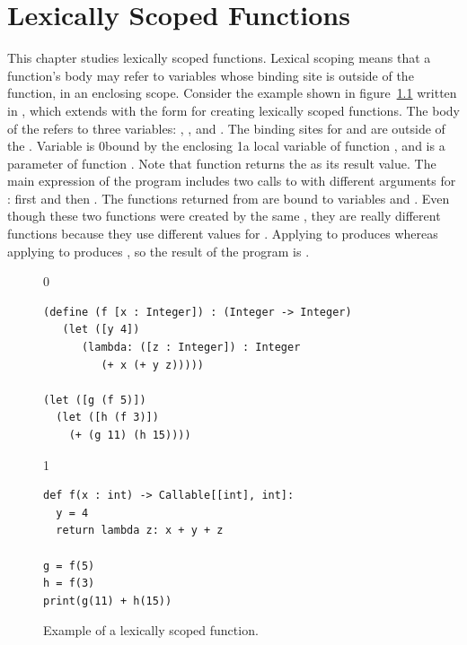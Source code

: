 \documentclass[7x10]{TimesAPriori_MIT}%
\def\racketEd{0}
\def\pythonEd{1}
\providecommand{\BookEdition}{1}
\let\edition\BookEdition
\newcommand{\racket}[1]{{\if\edition\racketEd{#1}\fi}}
\newcommand{\pythonColor}[0]{}
\newcommand{\python}[1]{{\if\edition\pythonEd\pythonColor #1\fi}}
\numberwithin{theorem}{chapter}
\numberwithin{definition}{chapter}
\numberwithin{equation}{chapter}
\begin{document}




\chapter{Lexically Scoped Functions}
\label{ch:Llambda}
\setcounter{footnote}{0}

This chapter studies lexically scoped functions. Lexical
scoping means that a function's body
may refer to variables whose binding site is outside of the function,
in an enclosing scope.
%
Consider the example shown in figure~\ref{fig:lexical-scoping} written
in \LangLam{}, which extends \LangFun{} with the
 form for creating lexically scoped
functions.  The body of the  refers to three variables:
, , and . The binding sites for  and
 are outside of the . Variable  is
\racket{bound by the enclosing }\python{a local variable of
  function }, and  is a parameter of function
. Note that function  returns the  as its
result value. The main expression of the program includes two calls to
 with different arguments for : first  and
then . The functions returned from  are bound to
variables  and . Even though these two functions were
created by the same , they are really different functions
because they use different values for . Applying  to
 produces  whereas applying  to 
produces , so the result of the program is .

\begin{figure}[btp]
\begin{tcolorbox}[colback=white]
{\if\edition\racketEd
\begin{lstlisting}
(define (f [x : Integer]) : (Integer -> Integer)
   (let ([y 4])
      (lambda: ([z : Integer]) : Integer
         (+ x (+ y z)))))

(let ([g (f 5)])
  (let ([h (f 3)])
    (+ (g 11) (h 15))))
\end{lstlisting}
\fi}
{\if\edition\pythonEd\pythonColor
\begin{lstlisting}
def f(x : int) -> Callable[[int], int]:
  y = 4
  return lambda z: x + y + z

g = f(5)
h = f(3)
print(g(11) + h(15))
\end{lstlisting}
\fi}
\end{tcolorbox}
\caption{Example of a lexically scoped function.}
\label{fig:lexical-scoping}
\end{figure}
\end{document}
